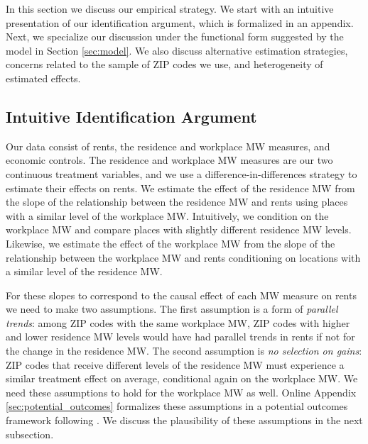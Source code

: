 
In this section we discuss our empirical strategy.
We start with an intuitive presentation of our identification argument, which
is formalized in an appendix.
Next, we specialize our discussion under the functional form suggested by
the model in Section \ref{sec:model}. 
We also discuss alternative estimation strategies, concerns related to
the sample of ZIP codes we use, and heterogeneity of estimated effects.

\subsection{Intuitive Identification Argument}

Our data consist of rents, the residence and workplace MW measures, and 
economic controls.
The residence and workplace MW measures are our two continuous treatment 
variables, and we use a difference-in-differences strategy to estimate their 
effects on rents.
We estimate the effect of the residence MW from the slope of the relationship 
between the residence MW and rents using places with a similar level of the 
workplace MW.
Intuitively, we condition on the workplace MW and compare places with slightly
different residence MW levels.
Likewise, we estimate the effect of the workplace MW from the slope of the 
relationship between the workplace MW and rents conditioning on locations 
with a similar level of the residence MW.

For these slopes to correspond to the causal effect of each MW measure on rents 
we need to make two assumptions.
The first assumption is a form of \textit{parallel trends}: among ZIP codes with 
the same workplace MW, ZIP codes with higher and lower residence MW levels would 
have had parallel trends in rents if not for the change in the residence MW.
The second assumption is \textit{no selection on gains}: ZIP codes that receive
different levels of the residence MW must experience a similar treatment effect
on average, conditional again on the workplace MW.
We need these assumptions to hold for the workplace MW as well.
Online Appendix \ref{sec:potential_outcomes} formalizes these assumptions in a 
potential outcomes framework following \textcite{CallawayEtAl2021}.
We discuss the plausibility of these assumptions in the next subsection.


